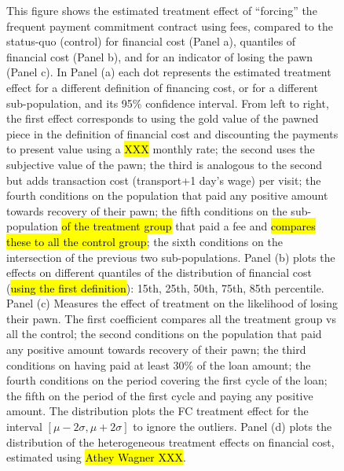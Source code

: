 \documentclass[11pt]{article}
\begin{document}
\begin{figure}[H]
\begin{center}
    \end{center}
        \scriptsize 
        This figure shows the estimated treatment effect of ``forcing'' the frequent payment commitment contract using fees, compared to the status-quo (control) for  financial cost (Panel a), quantiles of financial cost (Panel b), and for an indicator of losing the pawn (Panel c). In Panel (a) each dot represents the estimated treatment effect for a different definition of financing cost, or for a different sub-population, and its 95\% confidence interval. From left to right, the first effect corresponds to using the gold value of the pawned piece in the definition of financial cost and discounting the payments to present value using a \hl{XXX} monthly rate; the second uses the subjective value of the pawn; the third is analogous to the second but adds transaction cost (transport+1 day's wage) per visit; the fourth conditions on the population that paid any positive amount towards recovery of their pawn; the fifth conditions on the sub-population \hl{of the treatment group} that paid a fee and \hl{compares these to all the control group}; the sixth conditions on the intersection of the previous two sub-populations. Panel (b) plots the effects on different quantiles of the distribution of financial cost (\hl{using the first definition}): 15th, 25th, 50th, 75th, 85th percentile. Panel (c) Measures the effect of treatment on the likelihood of losing their pawn. The first coefficient compares all the treatment group vs all the control; the second conditions on the population that paid any positive amount towards recovery of their pawn; the third conditions on having paid at least 30\% of the loan amount; the fourth conditions on the period covering the first cycle of the loan; the fifth on the period of the first cycle and paying any positive amount. The distribution plots the FC treatment effect for the interval $[\mu-2\sigma,\mu+2\sigma]$ to ignore the outliers. Panel (d) plots the distribution of the heterogeneous treatment effects on financial cost, estimated using \hl{Athey Wagner XXX}. %
\end{figure}
\end{document}
